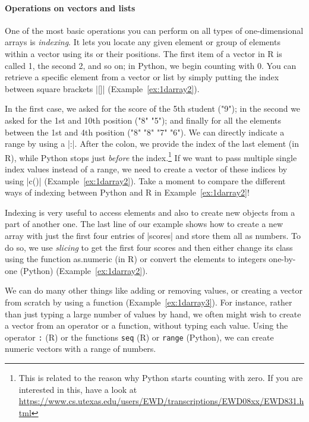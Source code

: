 \paragraph{Operations on vectors and lists}
One of the most
basic operations you can perform on all types of one-dimensional arrays
is \emph{indexing}. It lets you locate any given
element or group of elements within a vector using its or their
positions. The first item of a vector in R is called 1, the second 2, and so on;
in Python, we begin counting with 0.  You can retrieve a specific element
from a vector or list by simply putting the index between square brackets |[]| (Example~\ref{ex:1darray2}). 


In the first case, we asked for the score of the 5th student ("9");
in the second we asked for the 1st and 10th position ("8" "5"); and
finally for all the elements between the 1st and 4th position ("8"
"8" "7" "6"). We can directly indicate a range
by using a |:|. After the colon, we provide the index of
the last element (in R), while Python stops just \emph{before} the index.\footnote{This is related to the
reason why Python starts counting with zero. If you are interested
in this, have a look at \url{https://www.cs.utexas.edu/users/EWD/transcriptions/EWD08xx/EWD831.html}}
If we want to pass multiple single index values instead of a range,
we need to create a vector of these indices by using |c()| (Example~\ref{ex:1darray2}).
Take a moment to compare the different ways of indexing between Python
and R in Example~\ref{ex:1darray2}!

Indexing is very useful to access elements and also to
create new objects from a part of another one. The last line of our
example shows how to create a new array with just the first four
entries of |scores| and store them all as numbers. To do so, we
use \emph{slicing} to get the first four scores and then either change its class using the function
as.numeric (in R) or convert the elements to integers one-by-one (Python)  (Example~\ref{ex:1darray2}).



We can do many other things like adding or removing values, or creating a vector from scratch by using a
function (Example~\ref{ex:1darray3}). For instance, rather than just typing  a large number of values by hand, we often might
wish to create a vector from an operator or a function, without typing
each value. Using the operator \index{:}\texttt{:} (R) or the functions \texttt{seq} (R) or \texttt{range} (Python), we 
can create numeric vectors with
a range of numbers.


